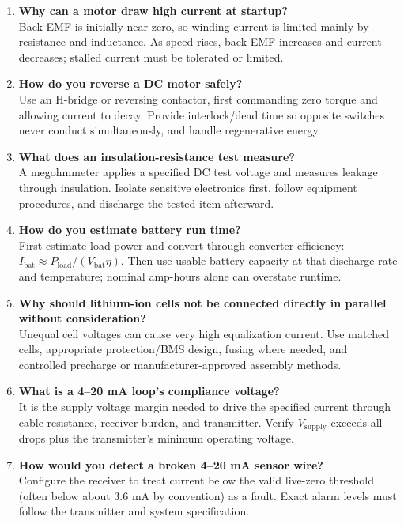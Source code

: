 \documentclass[11pt]{article}
\begin{document}
\begin{enumerate}
\item \textbf{Why can a motor draw high current at startup?}\\
Back EMF is initially near zero, so winding current is limited mainly by resistance and inductance. As speed rises, back EMF increases and current decreases; stalled current must be tolerated or limited.

\item \textbf{How do you reverse a DC motor safely?}\\
Use an H-bridge or reversing contactor, first commanding zero torque and allowing current to decay. Provide interlock/dead time so opposite switches never conduct simultaneously, and handle regenerative energy.

\item \textbf{What does an insulation-resistance test measure?}\\
A megohmmeter applies a specified DC test voltage and measures leakage through insulation. Isolate sensitive electronics first, follow equipment procedures, and discharge the tested item afterward.

\item \textbf{How do you estimate battery run time?}\\
First estimate load power and convert through converter efficiency: $I_\mathrm{bat}\approx P_\mathrm{load}/(V_\mathrm{bat}\eta)$. Then use usable battery capacity at that discharge rate and temperature; nominal amp-hours alone can overstate runtime.

\item \textbf{Why should lithium-ion cells not be connected directly in parallel without consideration?}\\
Unequal cell voltages can cause very high equalization current. Use matched cells, appropriate protection/BMS design, fusing where needed, and controlled precharge or manufacturer-approved assembly methods.

\item \textbf{What is a 4--20 mA loop's compliance voltage?}\\
It is the supply voltage margin needed to drive the specified current through cable resistance, receiver burden, and transmitter. Verify $V_\mathrm{supply}$ exceeds all drops plus the transmitter's minimum operating voltage.

\item \textbf{How would you detect a broken 4--20 mA sensor wire?}\\
Configure the receiver to treat current below the valid live-zero threshold (often below about 3.6 mA by convention) as a fault. Exact alarm levels must follow the transmitter and system specification.


\end{enumerate}
\end{document}
